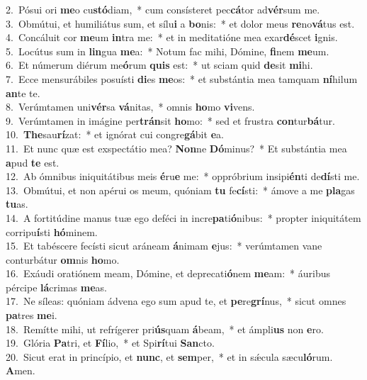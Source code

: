 {2.~}Pósui ori \textbf{me}o cu\textbf{stó}diam,~* cum consísteret pec\textbf{cá}tor ad\textbf{vér}sum me.\\
{3.~}Obmútui, et humiliátus sum, et sílu\textbf{i} a \textbf{bo}nis:~* et dolor meus \textbf{re}no\textbf{vá}tus est.\\
{4.~}Concáluit cor \textbf{me}um \textbf{in}tra me:~* et in meditatióne mea exar\textbf{dé}scet \textbf{i}gnis.\\
{5.~}Locútus sum in \textbf{lin}gua \textbf{me}a:~* Notum fac mihi, Dómine, \textbf{fi}nem \textbf{me}um.\\
{6.~}Et númerum diérum me\textbf{ó}rum \textbf{quis} est:~* ut sciam quid \textbf{de}sit \textbf{mi}hi.\\
{7.~}Ecce mensurábiles posuísti \textbf{di}es \textbf{me}os:~* et substántia mea tamquam \textbf{ní}hilum \textbf{an}te te.\\
{8.~}Verúmtamen uni\textbf{vér}sa \textbf{vá}nitas,~* omnis \textbf{ho}mo \textbf{vi}vens.\\
{9.~}Verúmtamen in imágine per\textbf{trán}sit \textbf{ho}mo:~* sed et frustra \textbf{con}tur\textbf{bá}tur.\\
{10.~}\textbf{The}sau\textbf{rí}zat:~* et ignórat cui congre\textbf{gá}bit \textbf{e}a.\\
{11.~}Et nunc quæ est exspectátio mea? \textbf{Non}ne \textbf{Dó}minus?~* Et substántia mea \textbf{a}pud \textbf{te} est.\\
{12.~}Ab ómnibus iniquitátibus meis \textbf{é}ru\textbf{e} me:~* oppróbrium insipi\textbf{én}ti de\textbf{dí}sti me.\\
{13.~}Obmútui, et non apérui os meum, quóniam \textbf{tu} fe\textbf{cí}sti:~* ámove a me \textbf{pla}gas \textbf{tu}as.\\
{14.~}A fortitúdine manus tuæ ego deféci in incre\textbf{pa}ti\textbf{ó}nibus:~* propter iniquitátem corripu\textbf{í}sti \textbf{hó}minem.\\
{15.~}Et tabéscere fecísti sicut aráneam \textbf{á}nimam \textbf{e}jus:~* verúmtamen vane conturbátur \textbf{om}nis \textbf{ho}mo.\\
{16.~}Exáudi oratiónem meam, Dómine, et deprecati\textbf{ó}nem \textbf{me}am:~* áuribus pércipe \textbf{lá}crimas \textbf{me}as.\\
{17.~}Ne síleas: quóniam ádvena ego sum apud te, et \textbf{pe}re\textbf{grí}nus,~* sicut omnes \textbf{pa}tres \textbf{me}i.\\
{18.~}Remítte mihi, ut refrígerer pri\textbf{ús}quam \textbf{á}beam,~* et ámpli\textbf{us} non \textbf{e}ro.\\
{19.~}Glória \textbf{Pa}tri, et \textbf{Fí}lio,~* et Spi\textbf{rí}tui \textbf{San}cto.\\
{20.~}Sicut erat in princípio, et \textbf{nunc}, et \textbf{sem}per,~* et in sǽcula sæcu\textbf{ló}rum. \textbf{A}men.\\
